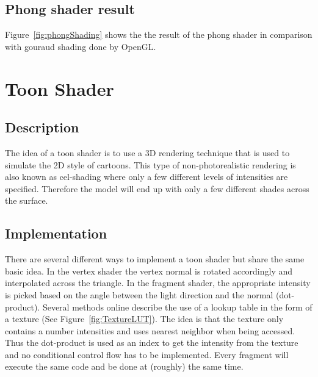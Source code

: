 \documentclass[a4paper,12pt]{article}
\begin{document}


\subsection{Phong shader result}
\label{sec:PhongShaderResult}
Figure~\ref{fig:phongShading} shows the the result of the phong shader in comparison with gouraud shading done by OpenGL.


\section{Toon Shader}
\label{sec:ToonShader}
\subsection{Description}
\label{sec:DescriptionToonShader}

The idea of a toon shader is to use a 3D rendering technique that is used to simulate the 2D style of cartoons. This type of non-photorealistic rendering is also known as cel-shading where only a few different levels of intensities are specified. Therefore the model will end up with only a few different shades across the surface.

\subsection{Implementation}
\label{sec:ImplementationToonShader}

There are several different ways to implement a toon shader but share the same basic idea. In the vertex shader the vertex normal is rotated accordingly and interpolated across the triangle. In the fragment shader, the appropriate intensity is picked based on the angle between the light direction and the normal (dot-product). Several methods online describe the use of a lookup table in the form of a texture (See Figure~\ref{fig:TextureLUT}). The idea is that the texture only contains a number intensities and uses nearest neighbor when being accessed. Thus the dot-product is used as an index to get the intensity from the texture and no conditional control flow has to be implemented. Every fragment will execute the same code and be done at (roughly) the same time.
\end{document}
